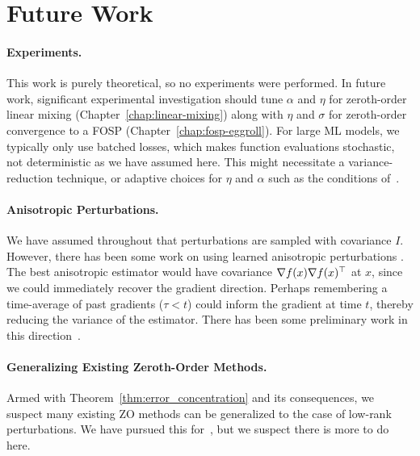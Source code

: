 \section{Future Work}
\paragraph{Experiments.}
This work is purely theoretical, so no experiments were performed. In future work, significant experimental investigation should tune $\alpha$ and $\eta$ for zeroth-order linear mixing (Chapter~\ref{chap:linear-mixing}) along with $\eta$ and $\sigma$ for zeroth-order convergence to a FOSP (Chapter~\ref{chap:fosp-eggroll}). For large ML models, we typically only use batched losses, which makes function evaluations stochastic, not deterministic as we have assumed here. This might necessitate a variance-reduction technique, or adaptive choices for $\eta$ and $\alpha$ such as the conditions of~\citet{robbins1951stochastic}. 

\paragraph{Anisotropic Perturbations.}
We have assumed throughout that perturbations are sampled with covariance $I$. However, there has been some work on using learned anisotropic perturbations \citep{seung2026lowrank}. The best anisotropic estimator would have covariance $\nabla f(x) \nabla f(x)^\top$ at $x$, since we could immediately recover the gradient direction. Perhaps remembering a time-average of past gradients ($\tau < t$) could inform the gradient at time $t$, thereby reducing the variance of the estimator. There has been some preliminary work in this direction~\citep{liu2020selfguided,meier2019improving}.

\paragraph{Generalizing Existing Zeroth-Order Methods.} Armed with Theorem~\ref{thm:error_concentration} and its consequences, we suspect many existing ZO methods can be generalized to the case of low-rank perturbations. We have pursued this for~\citet{ren2023escaping}, but we suspect there is more to do here.

